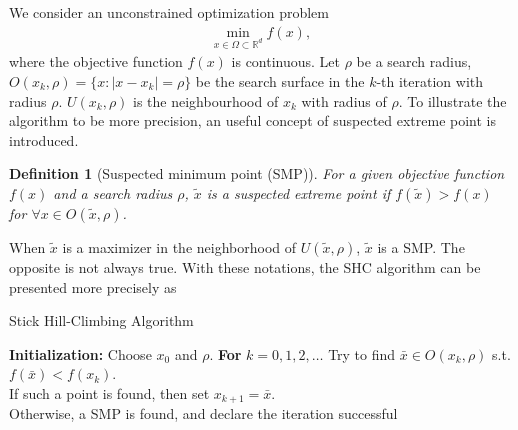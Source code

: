 \documentclass[preprint,12pt]{elsarticle}
\newtheorem{definition}{Definition}
\newtheorem{proposition}{Proposition}
\begin{document}
We consider an unconstrained optimization problem 
\begin{align}
	\min_{x\in\Omega\subset\mathbb{R}^d} f(x),
	\label{}
\end{align}
where the objective function $f(x)$ is continuous.
Let $\rho$ be a search radius, $O(x_k, \rho)=\{x:
|x-x_k|=\rho\}$ be the search surface in the
$k$-th iteration with radius $\rho$. $U(x_k,
\rho)$ is the neighbourhood of $x_k$ with radius of $\rho$.
To illustrate the algorithm to be more precision, an useful concept of
suspected extreme point is introduced.
\begin{definition}[Suspected minimum point (SMP)]
	For a given objective function $f(x)$ and a search radius
	$\rho$, $\tilde{x}$ is a suspected extreme point if $f(\tilde
	x)>f(x)$ for $\forall x\in O(\tilde{x},\rho)$.
\end{definition}
When $\tilde{x}$ is a maximizer in the neighborhood of $U(\tilde{x}, \rho)$,
$\tilde{x}$ is a SMP. The opposite is not always true.
With these notations, the SHC algorithm can be presented
more precisely as 
\begin{algorithm}[H]
	\caption{Stick Hill-Climbing Algorithm}
	\label{alg:SHC}
\begin{algorithmic}[1]
	\STATE \textbf{Initialization:} Choose $x_0$ and $\rho$.
	\STATE \textbf{For} $k=0,1,2,\dots$
	\STATE \hspace{0.5cm} Try to find $\bar{x}\in O(x_k, \rho)$
		   s.t. $f(\bar x)<f(x_k)$.
			\\
		 \hspace{0.5cm} If such a point is found, then set
		 $x_{k+1}= \bar{x}$.
		  \\
		   \hspace{0.5cm} Otherwise, a SMP is found, 
		   and declare the iteration successful 
\end{algorithmic}
\end{algorithm}
\end{document}
